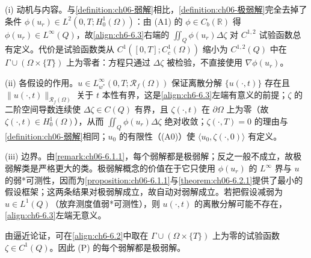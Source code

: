 \documentclass[../../main.tex]{subfiles}%
\begin{document}
\begin{remark}\label{remark:ch06-极弱解动机}
(i) 动机与内容。与\cref{definition:ch06-弱解}相比，\cref{definition:ch06-极弱解}完全去掉了条件 $\phi(u_r)\in L^2(0,T;H^1_0(\Omega))$：由 (A1) 的 $\phi\in C_b(\mathbb{R})$ 得 $\phi(u_r)\in L^\infty(Q)$，故\eqref{align:ch6-6.3}右端的 $\iint_Q\phi(u_r)\Delta\zeta$ 对 $C^{1,2}$ 试验函数总有定义。代价是试验函数类从 $C^1([0,T];C^1_c(\Omega))$ 缩小为 $C^{1,2}(Q)$ 中在 $\Gamma\cup(\Omega\times\{T\})$ 上为零者：方程只通过 $\Delta\zeta$ 被检验，不直接使用 $\nabla\phi(u_r)$。

(ii) 各假设的作用。$u\in L^\infty_{w^*}(0,T;\mathscr{R}_f(\Omega))$ 保证离散分解 $\{u(\cdot,t)\}$ 存在且 $\|u(\cdot,t)\|_{\mathscr{R}_f(\Omega)}$ 关于 $t$ 本性有界，这是\eqref{align:ch6-6.3}左端有意义的前提；$\zeta$ 的二阶空间导数连续使 $\Delta\zeta\in C(Q)$ 有界，且 $\zeta(\cdot,t)$ 在 $\partial\Omega$ 上为零（故 $\zeta(\cdot,t)\in H^1_0(\Omega)$），从而 $\iint_Q\phi(u_r)\Delta\zeta$ 绝对收敛；$\zeta(\cdot,T)=0$ 的理由与\cref{definition:ch06-弱解}相同；$u_0$ 的有限性（(A0)）使 $\langle u_0,\zeta(\cdot,0)\rangle$ 有定义。

(iii) 边界。由\cref{remark:ch06-6.1.1}，每个弱解都是极弱解；反之一般不成立，故极弱解类是严格更大的类。极弱解概念的价值在于它只使用 $\phi(u_r)$ 的 $L^\infty$ 界与 $u$ 的弱*可测性，因而为\cref{proposition:ch06-6.1.1}与\cref{theorem:ch06-6.2.1}提供了最小的假设框架；这两条结果对极弱解成立，故自动对弱解成立。若把假设减弱为 $u\in L^1(Q)$（放弃测度值弱*可测性），则 $u(\cdot,t)$ 的离散分解可能不存在，\eqref{align:ch6-6.3}左端无意义。
\end{remark}

\begin{remark}\label{remark:ch06-6.1.1}
由逼近论证，可在\eqref{align:ch6-6.2}中取在 $\Gamma\cup(\Omega\times\{T\})$ 上为零的试验函数 $\zeta\in C^1(Q)$。因此 (P) 的每个弱解都是极弱解。
\end{remark}
\end{document}
